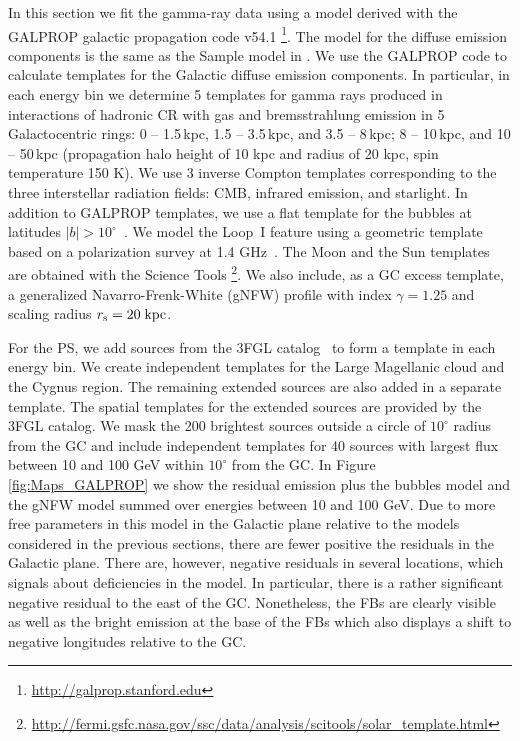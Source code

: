 In this section we fit the gamma-ray data using a model derived with the GALPROP
galactic propagation code v54.1
\citep{Moskalenko:1997gh, Strong:1998fr, Strong:2004de, Ptuskin:2005ax, 2007ARNPS..57..285S, Porter:2008ve,Vladimirov:2010aq}\footnote{\url{http://galprop.stanford.edu}}. 
The model for the diffuse emission components is the same as the Sample model in \cite{2017ApJ...840...43A}.
We use the GALPROP code to calculate templates for the Galactic diffuse emission components.
In particular, in each energy bin we determine 5 templates for gamma rays produced in 
interactions of hadronic CR with gas and bremsstrahlung emission in 5 Galactocentric rings: 
0 -- 1.5\,kpc, 1.5 -- 3.5\,kpc, and 3.5 -- 8\,kpc; 8 -- 10\,kpc, and 10 -- 50\,kpc
(propagation halo height of 10 kpc and radius of 20 kpc, spin temperature 150 K).
We use 3 inverse Compton templates corresponding to the three interstellar radiation fields: CMB, 
infrared emission, and starlight.
In addition to GALPROP templates, we use a flat template for the \Fermi bubbles at latitudes $|b| > 10^\circ$~\citep{2014ApJ...793...64A}. 
We model the Loop~I feature using a geometric template \citep[e.g., Figure 2 of][]{2014ApJ...793...64A}
based on a polarization survey at 1.4 GHz~\citep{Wolleben:2007pq}.
The Moon and the Sun \citep{2007Ap&SS.309..359O, 2006ApJ...652L..65M, 2008A&A...480..847O, 2013arXiv1307.0197J} templates 
are obtained with the \Fermi Science Tools%
\footnote{\url{http://fermi.gsfc.nasa.gov/ssc/data/analysis/scitools/solar_template.html}}.
We also include, as a GC excess template, a generalized Navarro-Frenk-White (gNFW) profile with index $\gamma = 1.25$ and scaling radius $r_{\rm s} = 20\;{\rm kpc}$.


For the PS, we add sources from the 3FGL catalog~\citep{2015ApJS..218...23A} to form a template
in each energy bin.
We create independent templates for the Large Magellanic cloud and the Cygnus region.
The remaining extended sources are also added in a separate template.
The spatial templates for the extended sources are provided by the 3FGL catalog.
We mask the 200 brightest sources outside a circle of $10^\circ$ radius from the GC and include independent templates
for 40 sources with largest flux between 10 and 100 GeV within $10^\circ$ from the GC.
In Figure \ref{fig:Maps_GALPROP} we show the residual emission plus the \Fermi bubbles model and the gNFW model summed over energies between 10 and 100 GeV.
Due to more free parameters in this model in the Galactic plane relative to the models considered in the previous sections,
there are fewer positive the residuals in the Galactic plane.
There are, however, negative residuals in several locations, which signals about deficiencies in the model. 
In particular, there is a rather significant negative residual to the east of the GC.
Nonetheless, the FBs are clearly visible as well as the bright emission at the base of the FBs which also displays a shift to negative
longitudes relative to the GC.


